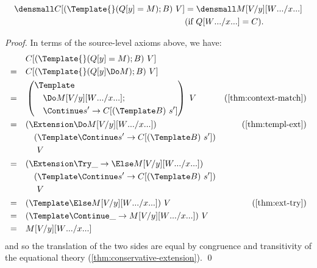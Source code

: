 \begin{lemma}
  \label{thm:context-exact-match}
  \begin{align*}
    \den{C[(\Template{} (Q[y] = M); B) ~ V]}
    &=
    \den{M\subst{y}{V}\subst{\many{x}}{\many{W}}}
    \\
    &(\text{if } Q\subst{\many{x}}{\many{W}} = C)
    .
  \end{align*}
\end{lemma}
\begin{proof}
  In terms of the source-level axioms above, we have:
  \begin{align*}
    &\quad
    C[(\Template{} (Q[y] = M); B) ~ V]
    \\
    =&\quad
    C[(\Template{} (Q[y] \Do M); B) ~ V]
    \\
    =&\quad
    \left(
      \begin{aligned}
        &\Template \\
        &\quad \Do M\subst{y}{V}\subst{\many{x}}{\many{W}}; \\
        &\quad \Continue s' \to C[(\Template B) ~ s']
      \end{aligned}
    \right)
    ~ V
    &(\cref{thm:context-match})
    \\
    =&\quad
    \begin{aligned}[t]
      &(\Extension \Do M\subst{y}{V}\subst{\many{x}}{\many{W}}) \\
      &\quad (\Template \Continue s' \to C[(\Template B) ~ s']) \\
      &\quad ~ V
    \end{aligned}
    &(\cref{thm:templ-ext})
    \\
    =&\quad
    \begin{aligned}[t]
      &(\Extension \Try \_ \to \Else M\subst{y}{V}\subst{\many{x}}{\many{W}}) \\
      &\quad (\Template \Continue s' \to C[(\Template B) ~ s']) \\
      &\quad ~ V
    \end{aligned}
    \\
    =&\quad
    (\Template \Else M\subst{y}{V}\subst{\many{x}}{\many{W}}) ~ V
    &(\cref{thm:ext-try})
    \\
    =&\quad
    (\Template \Continue \_ \to  M\subst{y}{V}\subst{\many{x}}{\many{W}}) ~ V
    \\
    =&\quad
    M\subst{y}{V}\subst{\many{x}}{\many{W}}
  \end{align*}
  and so the translation of the two sides are equal by congruence and transitivity of the equational theory (\cref{thm:conservative-extension}).
  \qed
  

\end{proof}
